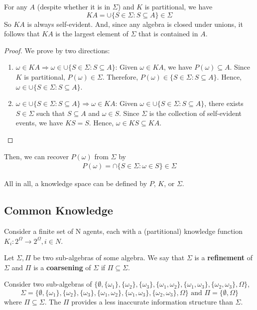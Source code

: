 \documentclass[11pt]{elegantbook_2}
\begin{document}
\begin{corollary}[$KA\in\Sigma$]
    For any $A$ (despite whether it is in $\Sigma$) and $K$ is partitional, we have $$KA = \cup\{S \in \Sigma : S \subseteq A\} \in \Sigma$$
    So $KA$ is always self-evident. And, since any algebra is closed under unions, it follows that $KA$ is the largest element of $\Sigma$ that is contained in $A$.
\end{corollary}
\begin{proof}
    We prove by two directions:
    \begin{enumerate}[(1).]
        \item \underline{$\omega\in KA \Rightarrow \omega\in\cup\{S \in \Sigma : S \subseteq A\}$}: Given $\omega\in KA$, we have $P(\omega)\subseteq A$. Since $K$ is partitional, $P(\omega)\in\Sigma$. Therefore, $P(\omega)\in\{S \in \Sigma : S \subseteq A\}$. Hence, $\omega\in \cup\{S \in \Sigma : S \subseteq A\}$.
        \item \underline{$\omega\in\cup\{S \in \Sigma : S \subseteq A\} \Rightarrow \omega\in KA$}: Given $\omega\in\cup\{S \in \Sigma : S \subseteq A\}$, there exists $S\in\Sigma$ such that $S \subseteq A$ and $\omega\in S$. Since $\Sigma$ is the collection of self-evident events, we have $KS=S$. Hence, $\omega\in KS\subseteq KA$.
    \end{enumerate}
\end{proof}
Then, we can recover $P(\omega)$ from $\Sigma$ by
\begin{equation}
    \begin{aligned}
        P(\omega)=\cap\{S\in\Sigma:\omega\in S\}\in\Sigma
    \end{aligned}
    \nonumber
\end{equation}

All in all, a knowledge space can be defined by $P$, $K$, or $\Sigma$.

\subsection{Common Knowledge}
Consider a finite set of N agents, each with a (partitional) knowledge function $K_i:2^\Omega \rightarrow 2^\Omega, i\in N$.

\begin{definition}
    Let $\Sigma, \Pi$ be two sub-algebras of some algebra. We say that $\Sigma$ is a \textbf{refinement} of $\Sigma$ and $\Pi$ is a \textbf{coarsening} of $\Sigma$ if $\Pi \subseteq \Sigma$.
\end{definition}
\begin{example}
    Consider two sub-algebras of $\{\emptyset,\{\omega_1\},\{\omega_2\},\{\omega_3\},\{\omega_1,\omega_2\},\{\omega_1,\omega_3\},\{\omega_2,\omega_3\},\Omega\}$, $$\Sigma=\{\emptyset,\{\omega_1\},\{\omega_2\},\{\omega_3\},\{\omega_1,\omega_2\},\{\omega_1,\omega_3\},\{\omega_2,\omega_3\},\Omega\}\text{ and }\Pi=\{\emptyset,\Omega\}$$
    where $\Pi\subseteq \Sigma$. The $\Pi$ provides a less inaccurate information structure than $\Sigma$.
\end{example}
\end{document}
